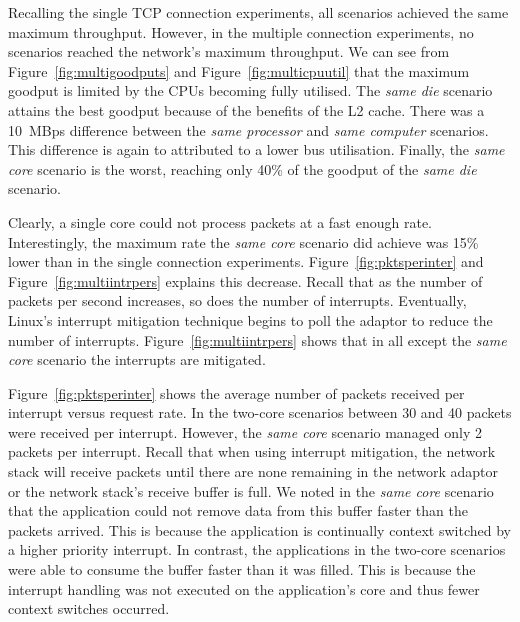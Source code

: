 \documentclass[conference, compsoc]{IEEEtran}
\begin{document}
Recalling the single TCP connection experiments, all scenarios achieved the same maximum throughput. However, in the multiple connection experiments, no scenarios reached the network's maximum throughput. We can see from Figure~\ref{fig:multigoodputs} and Figure~\ref{fig:multicpuutil} that the maximum goodput is limited by the CPUs becoming fully utilised. The \emph{same die} scenario attains the best goodput because of the benefits of the L2 cache. There was a 10~MBps difference between the \emph{same processor} and \emph{same computer} scenarios. This difference is again to attributed to a lower bus utilisation. Finally, the \emph{same core} scenario is the worst, reaching only 40\% of the goodput of the \emph{same die} scenario.

Clearly, a single core could not process packets at a fast enough rate. Interestingly, the maximum rate the \emph{same core} scenario did achieve was 15\% lower than in the single connection experiments. Figure~\ref{fig:pktsperinter} and Figure~\ref{fig:multiintrpers} explains this decrease. Recall that as the number of packets per second increases, so does the number of interrupts. Eventually, Linux's interrupt mitigation technique begins to poll the adaptor to reduce the number of interrupts. Figure~\ref{fig:multiintrpers} shows that in all except the \emph{same core} scenario the interrupts are mitigated.

Figure~\ref{fig:pktsperinter} shows the average number of packets received per interrupt versus request rate. In the two-core scenarios between 30 and 40 packets were received per interrupt. However, the \emph{same core} scenario managed only 2 packets per interrupt. Recall that when using interrupt mitigation, the network stack will receive packets until there are none remaining in the network adaptor or the network stack's receive buffer is full. We noted in the \emph{same core} scenario that the application could not remove data from this buffer faster than the packets arrived. This is because the application is continually context switched by a higher priority interrupt. In contrast, the applications in the two-core scenarios were able to consume the buffer faster than it was filled. This is because the interrupt handling was not executed on the application's core and thus fewer context switches occurred.

\end{document}
